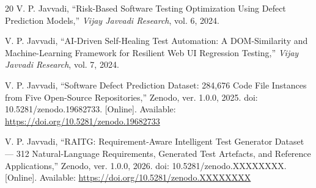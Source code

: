 \documentclass[11pt,letterpaper]{article}
\begin{document}
\begin{thebibliography}{20}
V. P. Javvadi, ``Risk-Based Software Testing Optimization Using Defect Prediction Models,'' \textit{Vijay Javvadi Research}, vol. 6, 2024.

V. P. Javvadi, ``AI-Driven Self-Healing Test Automation: A DOM-Similarity and Machine-Learning Framework for Resilient Web UI Regression Testing,'' \textit{Vijay Javvadi Research}, vol. 7, 2024.

V. P. Javvadi, ``Software Defect Prediction Dataset: 284,676 Code File Instances from Five Open-Source Repositories,'' Zenodo, ver. 1.0.0, 2025. doi: 10.5281/zenodo.19682733. [Online]. Available: \url{https://doi.org/10.5281/zenodo.19682733}

V. P. Javvadi, ``RAITG: Requirement-Aware Intelligent Test Generator Dataset --- 312 Natural-Language Requirements, Generated Test Artefacts, and Reference Applications,'' Zenodo, ver. 1.0.0, 2026. doi: 10.5281/zenodo.XXXXXXXX. [Online]. Available: \url{https://doi.org/10.5281/zenodo.XXXXXXXX}

\end{thebibliography}
\end{document}
